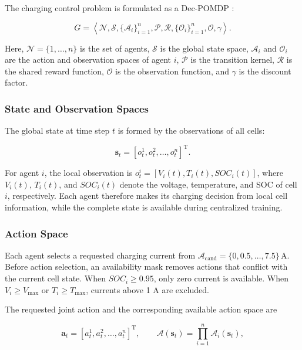 The charging control problem is formulated as a Dec-POMDP \cite{27}:

\[
G=
\left\langle
\mathcal{N},
\mathcal{S},
\{\mathcal{A}_i\}_{i=1}^{n},
\mathcal{P},
\mathcal{R},
\{\mathcal{O}_i\}_{i=1}^{n},
\mathcal{O},
\gamma
\right\rangle .
\]

Here, $\mathcal{N}=\{1,\ldots,n\}$ is the set of agents, $\mathcal{S}$ is the global state space, $\mathcal{A}_i$ and $\mathcal{O}_i$ are the action and observation spaces of agent $i$, $\mathcal{P}$ is the transition kernel, $\mathcal{R}$ is the shared reward function, $\mathcal{O}$ is the observation function, and $\gamma$ is the discount factor.

\subsubsection{State and Observation Spaces}

The global state at time step $t$ is formed by the observations of all cells:

\begin{equation}
\label{eq:global_state}
\mathbf{s}_t
=
\left[
o_t^1,o_t^2,\ldots,o_t^n
\right]^{\mathrm{T}}.
\end{equation}

For agent $i$, the local observation is
$o_t^i=[V_i(t),T_i(t),SOC_i(t)]$, where $V_i(t)$, $T_i(t)$, and $SOC_i(t)$ denote the voltage, temperature, and SOC of cell $i$, respectively. Each agent therefore makes its charging decision from local cell information, while the complete state is available during centralized training.

\subsubsection{Action Space}

Each agent selects a requested charging current from
$\mathcal{A}_{\mathrm{cand}}=\{0,0.5,\ldots,7.5\}\,\mathrm{A}$.
Before action selection, an availability mask removes actions that conflict with the current cell state. When $SOC_i\geq0.95$, only zero current is available. When $V_i\geq V_{\max}$ or $T_i\geq T_{\max}$, currents above 1 A are excluded.

The requested joint action and the corresponding available action space are

\begin{equation}
\label{eq:joint_action}
\mathbf{a}_t
=
\left[
a_t^1,a_t^2,\ldots,a_t^n
\right]^{\mathrm{T}},
\qquad
\mathcal{A}(\mathbf{s}_t)
=
\prod_{i=1}^{n}\mathcal{A}_i(\mathbf{s}_t),
\end{equation}

